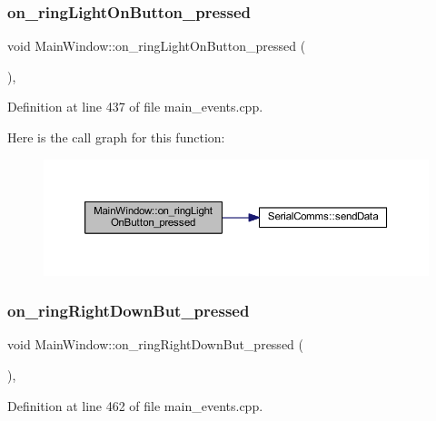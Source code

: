 \subsubsection{\texorpdfstring{on\_ringLightOnButton\_pressed}{on\_ringLightOnButton\_pressed}}
{\footnotesize\ttfamily void Main\+Window\+::on\+\_\+ring\+Light\+On\+Button\+\_\+pressed (\begin{DoxyParamCaption}{ }\end{DoxyParamCaption})\hspace{0.3cm}{\ttfamily [private]}, {\ttfamily [slot]}}



Definition at line 437 of file main\+\_\+events.\+cpp.

Here is the call graph for this function\+:
\nopagebreak
\begin{figure}[H]
\begin{center}
\leavevmode
\includegraphics[width=350pt]{class_main_window_ac7c8a9d8f85ea41b9017fb13c95c3e79_cgraph}
\end{center}
\end{figure}
\mbox{\label{class_main_window_a2a0d4d64e7fe2ee99abce8e41eb4afd1}} 
\subsubsection{\texorpdfstring{on\_ringRightDownBut\_pressed}{on\_ringRightDownBut\_pressed}}
{\footnotesize\ttfamily void Main\+Window\+::on\+\_\+ring\+Right\+Down\+But\+\_\+pressed (\begin{DoxyParamCaption}{ }\end{DoxyParamCaption})\hspace{0.3cm}{\ttfamily [private]}, {\ttfamily [slot]}}



Definition at line 462 of file main\+\_\+events.\+cpp.

